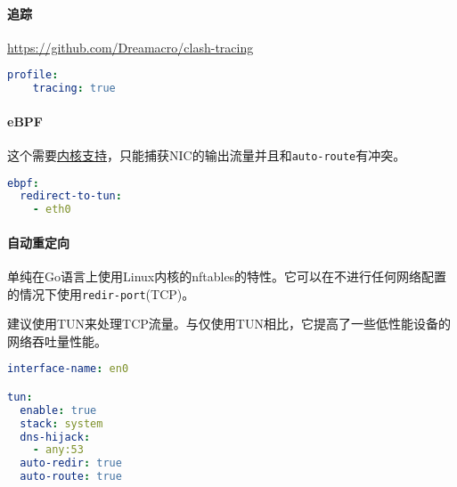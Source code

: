 \paragraph{追踪}\url{https://github.com/Dreamacro/clash-tracing}\\


\begin{lstlisting}[breaklines=true,language=yaml,style=yaml]
profile:
    tracing: true
\end{lstlisting}


\paragraph{eBPF} 这个需要\href{https://github.com/iovisor/bcc/blob/master/INSTALL.md#kernel-configuration}{内核支持}，只能捕获NIC的输出流量并且和\verb|auto-route|有冲突。\\


\begin{lstlisting}[breaklines=true,language=yaml,style=yaml]
ebpf:
  redirect-to-tun:
    - eth0
\end{lstlisting}

\paragraph{自动重定向}
单纯在Go语言上使用Linux内核的nftables的特性。它可以在不进行任何网络配置的情况下使用\verb|redir-port|(TCP)。


建议使用TUN来处理TCP流量。与仅使用TUN相比，它提高了一些低性能设备的网络吞吐量性能。


\begin{lstlisting}[breaklines=true,language=yaml,style=yaml]
interface-name: en0

tun:
  enable: true
  stack: system
  dns-hijack:
    - any:53
  auto-redir: true
  auto-route: true
\end{lstlisting}